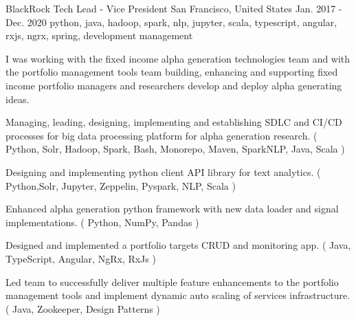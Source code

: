 \cventry
    {BlackRock} %
    { Tech Lead - Vice President} %
    {San Francisco, United States} %
    {Jan. 2017 - Dec. 2020} %
    { python, java, hadoop, spark, nlp, jupyter, scala, typescript, angular, rxjs, ngrx, spring, development management} %
    {
        I was working with the fixed income alpha generation technologies team and with the portfolio management tools team building,
        enhancing and supporting fixed income portfolio managers and researchers develop and deploy alpha generating ideas.
    \begin{cvitems} %
        \item { Managing, leading, designing, implementing and establishing SDLC and CI/CD processes for big data processing platform for alpha generation research. ( Python, Solr, Hadoop, Spark, Bash, Monorepo, Maven, SparkNLP, Java, Scala ) }
        \item { Designing and implementing python client API library for text analytics. ( Python,Solr, Jupyter, Zeppelin, Pyspark, NLP, Scala )}
        \item { Enhanced alpha generation python framework with new data loader and signal implementations. ( Python, NumPy, Pandas )}
        \item { Designed and implemented a portfolio targets CRUD and monitoring app. ( Java, TypeScript, Angular, NgRx, RxJs ) }
        \item { Led team to successfully deliver multiple feature enhancements to the portfolio management tools and implement dynamic auto scaling of services
        infrastructure. ( Java, Zookeeper, Design Patterns )}
    \end{cvitems}
    }





